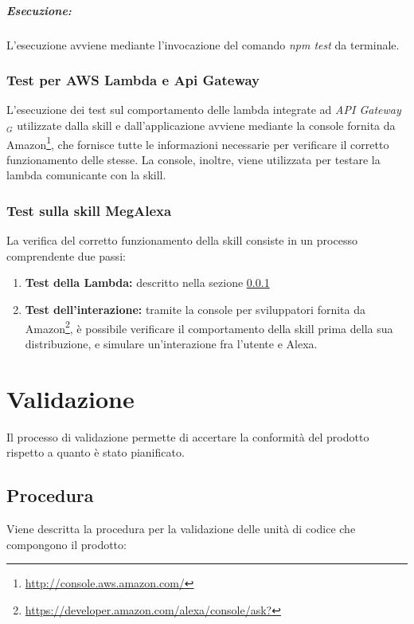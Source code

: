 \subparagraph{Esecuzione:} L'esecuzione avviene mediante l'invocazione del comando \textit{npm test} da terminale. 

\subsubsection{Test per AWS Lambda e Api Gateway}\label{labmdatest}
L'esecuzione dei test sul comportamento delle lambda integrate ad \textit{API Gateway$_{G}$} utilizzate dalla skill e dall'applicazione avviene mediante la console fornita da Amazon\footnote{\url{http://console.aws.amazon.com/}}, che fornisce tutte le informazioni necessarie per verificare il corretto funzionamento delle stesse.
La console, inoltre, viene utilizzata per testare la lambda comunicante con la skill.

\subsubsection{Test sulla skill MegAlexa}
La verifica del corretto funzionamento della skill consiste in un processo comprendente due passi:
\begin{enumerate}
	\item 	\textbf{Test della Lambda:} descritto nella sezione \ref{labmdatest}
	\item \textbf{Test dell'interazione:} tramite la console per sviluppatori fornita da Amazon\footnote{\url{https://developer.amazon.com/alexa/console/ask?}}, è possibile verificare il comportamento della skill prima della sua distribuzione, e simulare un'interazione fra l'utente e Alexa.
\end{enumerate}
\section{Validazione}
Il processo di validazione permette di accertare la conformità del prodotto rispetto a quanto è stato pianificato.\\

\subsection{Procedura}
Viene descritta la procedura per la validazione delle unità di codice che compongono il prodotto:

